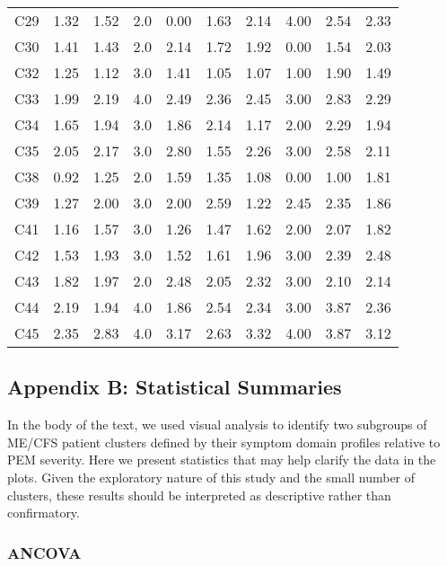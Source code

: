 \documentclass[
  letterpaper,
  DIV=11,
  numbers=noendperiod]{scrartcl}
\begin{document}
\begin{table}[h]
{\begin{tabular*}{\linewidth}{@{\extracolsep{\fill}}lrrrrrrrrr}
C29 & 1.32 & 1.52 & 2.0 & 0.00 & 1.63 & 2.14 & 4.00 & 2.54 & 2.33 \\ 
C30 & 1.41 & 1.43 & 2.0 & 2.14 & 1.72 & 1.92 & 0.00 & 1.54 & 2.03 \\ 
C32 & 1.25 & 1.12 & 3.0 & 1.41 & 1.05 & 1.07 & 1.00 & 1.90 & 1.49 \\ 
C33 & 1.99 & 2.19 & 4.0 & 2.49 & 2.36 & 2.45 & 3.00 & 2.83 & 2.29 \\ 
C34 & 1.65 & 1.94 & 3.0 & 1.86 & 2.14 & 1.17 & 2.00 & 2.29 & 1.94 \\ 
C35 & 2.05 & 2.17 & 3.0 & 2.80 & 1.55 & 2.26 & 3.00 & 2.58 & 2.11 \\ 
C38 & 0.92 & 1.25 & 2.0 & 1.59 & 1.35 & 1.08 & 0.00 & 1.00 & 1.81 \\ 
C39 & 1.27 & 2.00 & 3.0 & 2.00 & 2.59 & 1.22 & 2.45 & 2.35 & 1.86 \\ 
C41 & 1.16 & 1.57 & 3.0 & 1.26 & 1.47 & 1.62 & 2.00 & 2.07 & 1.82 \\ 
C42 & 1.53 & 1.93 & 3.0 & 1.52 & 1.61 & 1.96 & 3.00 & 2.39 & 2.48 \\ 
C43 & 1.82 & 1.97 & 2.0 & 2.48 & 2.05 & 2.32 & 3.00 & 2.10 & 2.14 \\ 
C44 & 2.19 & 1.94 & 4.0 & 1.86 & 2.54 & 2.34 & 3.00 & 3.87 & 2.36 \\ 
C45 & 2.35 & 2.83 & 4.0 & 3.17 & 2.63 & 3.32 & 4.00 & 3.87 & 3.12 \\ 
\bottomrule
\end{tabular*}

}

\end{table}%

\FloatBarrier

\subsection*{Appendix B: Statistical Summaries}\label{sec-stats}

In the body of the text, we used visual analysis to identify two
subgroups of ME/CFS patient clusters defined by their symptom domain
profiles relative to PEM severity. Here we present statistics that may
help clarify the data in the plots. Given the exploratory nature of this
study and the small number of clusters, these results should be
interpreted as descriptive rather than confirmatory.

\bigskip

\subsubsection*{ANCOVA}\label{sec-ancova}
\end{document}
